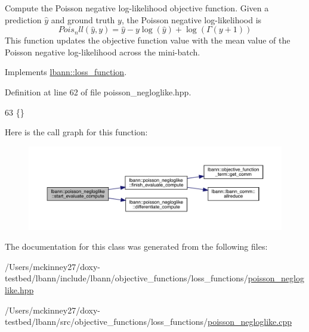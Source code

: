 Compute the Poisson negative log-\/likelihood objective function. Given a prediction $\hat{y}$ and ground truth $y$, the Poisson negative log-\/likelihood is \[ Pois_nll(\hat{y}, y) = \hat{y} - y\log(\hat{y}) + \log(\Gamma(y + 1)) \] This function updates the objective function value with the mean value of the Poisson negative log-\/likelihood across the mini-\/batch. 

Implements \hyperlink{classlbann_1_1loss__function_a0bbe41060d788dc7a29f3737761a6f7d}{lbann\+::loss\+\_\+function}.



Definition at line 62 of file poisson\+\_\+negloglike.\+hpp.


\begin{DoxyCode}
63                                                                        \{\}
\end{DoxyCode}
Here is the call graph for this function\+:\nopagebreak
\begin{figure}[H]
\begin{center}
\leavevmode
\includegraphics[width=350pt]{classlbann_1_1poisson__negloglike_ad69c0a20f5015ee02eb0c20e87129ffa_cgraph}
\end{center}
\end{figure}


The documentation for this class was generated from the following files\+:\begin{DoxyCompactItemize}
\item 
/\+Users/mckinney27/doxy-\/testbed/lbann/include/lbann/objective\+\_\+functions/loss\+\_\+functions/\hyperlink{poisson__negloglike_8hpp}{poisson\+\_\+negloglike.\+hpp}\item 
/\+Users/mckinney27/doxy-\/testbed/lbann/src/objective\+\_\+functions/loss\+\_\+functions/\hyperlink{poisson__negloglike_8cpp}{poisson\+\_\+negloglike.\+cpp}\end{DoxyCompactItemize}
